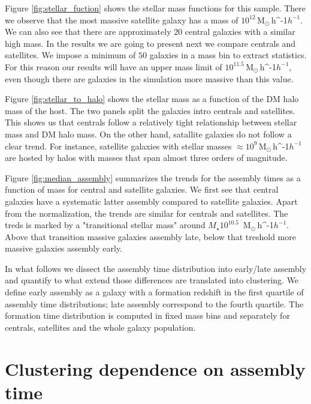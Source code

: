 \documentclass[fleqn,usenatbib]{mnras}
\newcommand{\Msunh}{\,{\rm M}$_{\odot}$\,\ifmmode h^{-1}\else $h^{-1}$\fi}
\begin{document}
Figure \ref{fig:stellar_fuction} shows the stellar mass functions for
this sample.
There we observe that the most massive satellite galaxy has a
mass of $10^{12}$\Msunh.  
We can also see that there are approximately $20$ central galaxies
with a similar high mass. 
In the results we are going to present next we compare centrals and
satellites. 
We impose a  minimum of $50$ galaxies in a mass bin to extract statistics. 
For this reason our results will have an upper mass limit of
$10^{11.5}$\Msunh, even though there are galaxies in the simulation
more massive than this value.

Figure \ref{fig:stellar_to_halo} shows the stellar mass as a function
of the DM halo mass of the host.
The two panels split the galaxies intro centrals and satellites. 
This shows us that centrals follow a relatively tight relationship
between stellar mass and DM halo mass.
On the other hand, satallite galaxies do not follow a clear trend.
For instance, satellite galaxies with stellar masses $\approx
10^{9}$\Msunh are hosted by halos with masses that span almost three
orders of magnitude.

Figure \ref{fig:median_assembly} summarizes the trends for the
assembly times as a function of mass for central and satellite
galaxies.
We first see that central galaxies have a systematic latter assembly
compared to satellite galaxies.
Apart from the normalization, the trends are similar for centrals and
satellites.
The treds is marked by a "transitional stellar mass" around 
$M_\star
10^{10.5}$ \Msunh.
Above that transition massive galaxies assembly late, below that
treshold more massive galaxies assembly early.

In what follows we dissect the assembly time distribution into
early/late assembly and quantify to what extend those differences are
translated into clustering.
We define early assembly as a galaxy with a formation redshift in the
first quartile of assembly time distributions; late
assembly correspond to the fourth quartile.
The formation time distribution is computed in fixed mass bins and
separately for centrals, satellites and the whole galaxy population. 


\section{Clustering dependence on assembly time}
\end{document}
